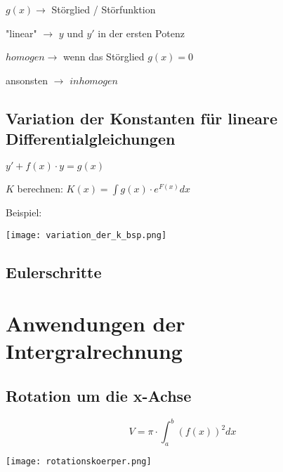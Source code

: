 \begin{multicols*}{3}
    {$g(x) \rightarrow$ Störglied / Störfunktion}

    { "linear" $\rightarrow$ $y$ und $y'$ in der ersten Potenz}

    { $homogen \rightarrow$ wenn das Störglied  $g(x)=0$}

    { ansonsten $\rightarrow$ $inhomogen$}

    \subsection{ Variation der Konstanten für lineare Differentialgleichungen}


    {       $y' + f(x) \cdot y = g(x)$}



     {$K$ berechnen: \large $K(x) = \int g(x) \cdot e^{F(x)} dx $}





    {Beispiel:}

    \texttt{[image: variation\_der\_k\_bsp.png]}




    \subsection{ Eulerschritte}
    \vfill\null
    \columnbreak
    \vfill\null
    \columnbreak

    \section{Anwendungen der Intergralrechnung}
    \subsection{Rotation um die x-Achse}

    \begin{multicols}{2}

        {$$V = \pi \cdot \int_{a}^{b}(f(x))^2dx$$}

        \columnbreak
        \texttt{[image: rotationskoerper.png]}
    \end{multicols}



\end{multicols*}
